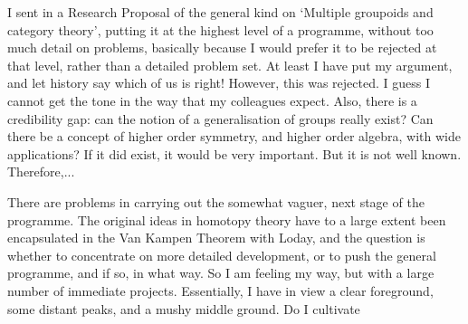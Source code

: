 I sent in a Research Proposal of the general kind on `Multiple
groupoids and category theory', putting it at the highest level of a
programme, without too much detail on problems, basically because I would
prefer it to be rejected at that level, rather than a detailed problem set.
At least I have put my argument, and let history say which of us is right!
However, this was rejected. I guess I cannot get the tone in the way that
my colleagues expect. Also, there is a credibility gap: can the notion of a
generalisation of groups really exist? Can there be a concept of higher
order symmetry, and higher order algebra, with wide applications? If it did
exist, it would be very important. But it is not well known. Therefore,...

There are problems in carrying out the somewhat vaguer, next stage of
the programme. The original ideas in homotopy theory have to a large extent
been encapsulated in the Van Kampen Theorem with Loday, and the question is
whether to concentrate on more detailed development, or to push the general
programme, and if so, in what way. So I am feeling my way, but with a large
number of immediate projects. Essentially, I have in view a clear
foreground, some distant peaks, and a mushy middle ground. Do I cultivate


